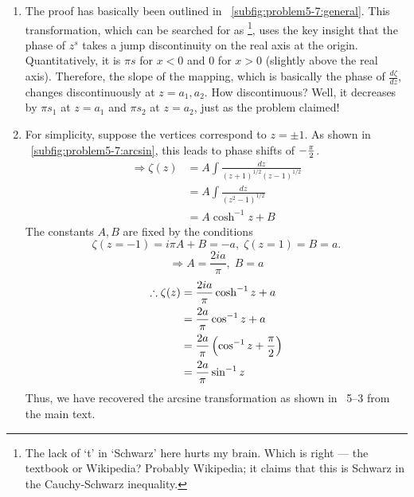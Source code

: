 \begin{enumerate}[wide, labelindent = 0pt, label = (\alph*)]
\item
The proof has basically been outlined in ~\ref{subfig:problem5-7:general}.
This transformation, which can be searched for as %
%
\footnote{The lack of `t' in `Schwarz' here hurts my brain.
Which is right --- the textbook or Wikipedia?
Probably Wikipedia; it claims that this is Schwarz in the Cauchy-Schwarz inequality.},
uses the key insight that the phase of $z^s$ takes a jump discontinuity
on the real axis at the origin.
Quantitatively, it is $\pi s$ for $x < 0$ and $0$ for $x > 0$ (slightly above the real axis).
Therefore, the slope of the mapping, which is basically the phase of $\frac{d\zeta}{dz}$,
changes discontinuously at $z = a_1, a_2$.
How discontinuous? Well, it decreases by $\pi s_1$ at $z = a_1$ and $\pi s_2$ at $z = a_2$,
just as the problem claimed!

\item
For simplicity, suppose the vertices correspond to $z = \pm 1$.
As shown in ~\ref{subfig:problem5-7:arcsin}, this leads to phase shifts of $-\frac{\pi}{2}$.
\begin{align*}
    \Rightarrow \zeta(z)
    &= A\int \frac{dz}{{(z + 1)}^{1/2} {(z - 1)}^{1/2}} \\
    &= A\int \frac{dz}{{\left( z^2 - 1 \right)}^{1/2}} \\
    &= A\cosh^{-1} z + B
\end{align*}
The constants $A, B$ are fixed by the conditions
\[
    \zeta(z=-1) = i\pi A + B = -a,\; \zeta(z=1) = B = a.
\]
\[
    \Rightarrow A = \frac{2ia}{\pi},\; B = a
\]
\begin{align*}
    \therefore \zeta(z)
    &= \frac{2ia}{\pi} \cosh^{-1} z + a \\
    &= \frac{2a}{\pi} \cos^{-1} z + a \\
    &= \frac{2a}{\pi} \left( \cos^{-1} z + \frac{\pi}{2} \right) \\
    &= \frac{2a}{\pi} \sin^{-1} z
\end{align*}
Thus, we have recovered the arcsine transformation as shown in ~5--3 from the main text.

\end{enumerate}

